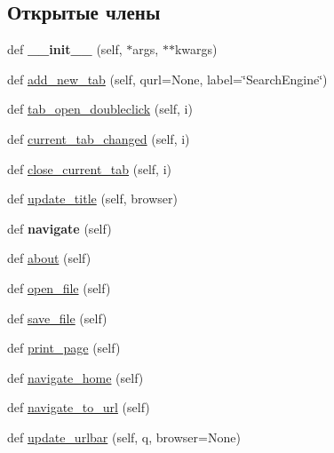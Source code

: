 \subsection*{Открытые члены}
\begin{DoxyCompactItemize}
\item 
\mbox{\label{classbrowser__tabbed_1_1MainWindow_a8e147896cb9e67959d23acca4bca2a4e}} 
def {\bfseries \+\_\+\+\_\+init\+\_\+\+\_\+} (self, $\ast$args, $\ast$$\ast$kwargs)
\item 
def \mbox{\hyperlink{classbrowser__tabbed_1_1MainWindow_a96249e8bbbc2f6e52c8c6775770760e9}{add\+\_\+new\+\_\+tab}} (self, qurl=None, label=\char`\"{}Search\+Engine\char`\"{})
\item 
def \mbox{\hyperlink{classbrowser__tabbed_1_1MainWindow_ad5d0f3d91b8e98b93fbda5a2faa71c8f}{tab\+\_\+open\+\_\+doubleclick}} (self, i)
\item 
def \mbox{\hyperlink{classbrowser__tabbed_1_1MainWindow_aac27b540c1b453a2a1f003fbeb26ec2a}{current\+\_\+tab\+\_\+changed}} (self, i)
\item 
def \mbox{\hyperlink{classbrowser__tabbed_1_1MainWindow_ada7aae65e67299b6d9a0661bf01a9523}{close\+\_\+current\+\_\+tab}} (self, i)
\item 
def \mbox{\hyperlink{classbrowser__tabbed_1_1MainWindow_aee87c269095bcb23bdc1bceac2343194}{update\+\_\+title}} (self, browser)
\item 
\mbox{\label{classbrowser__tabbed_1_1MainWindow_a974ffd070f69563105f3b1dfa9357e0a}} 
def {\bfseries navigate} (self)
\item 
def \mbox{\hyperlink{classbrowser__tabbed_1_1MainWindow_a34358ef47ecb6329e58ed64300496d12}{about}} (self)
\item 
def \mbox{\hyperlink{classbrowser__tabbed_1_1MainWindow_a9c7888540a8fd88cf270f5d05e9887f8}{open\+\_\+file}} (self)
\item 
def \mbox{\hyperlink{classbrowser__tabbed_1_1MainWindow_a899a0235d4065a5494d57581c4e2f91e}{save\+\_\+file}} (self)
\item 
def \mbox{\hyperlink{classbrowser__tabbed_1_1MainWindow_a89e86259d16b00e345c289b8e4c14bd2}{print\+\_\+page}} (self)
\item 
def \mbox{\hyperlink{classbrowser__tabbed_1_1MainWindow_a6ee1788107a79d7634f5a47e837745f2}{navigate\+\_\+home}} (self)
\item 
def \mbox{\hyperlink{classbrowser__tabbed_1_1MainWindow_a9b6f140d19517577ffec0f74d13a8a0c}{navigate\+\_\+to\+\_\+url}} (self)
\item 
def \mbox{\hyperlink{classbrowser__tabbed_1_1MainWindow_a685eb00ce77d2eb76ec7cbe7f69b8e51}{update\+\_\+urlbar}} (self, q, browser=None)
\end{DoxyCompactItemize}
